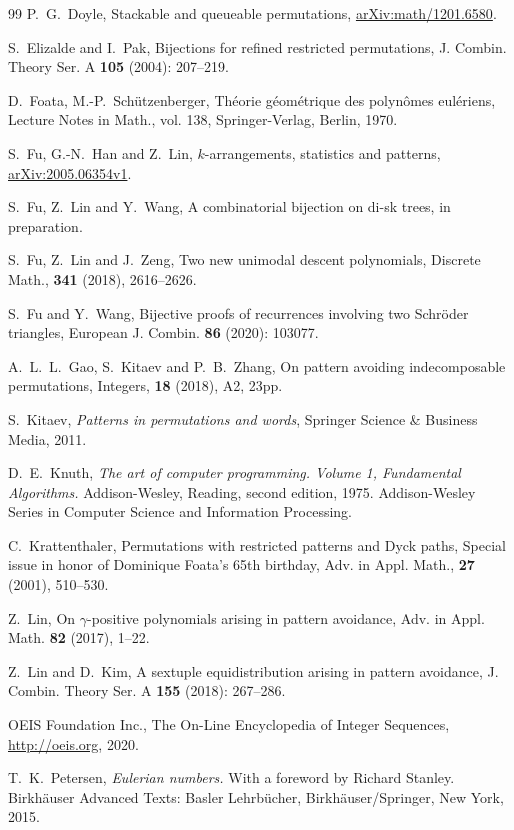 \documentclass[12pt]{amsart}
\numberwithin{equation}{section}
\theoremstyle{plain}
\theoremstyle{definition}
\begin{document}
\begin{thebibliography}{99}
 P.~G.~Doyle, Stackable and queueable permutations, \href{https://arxiv.org/abs/1201.6580}{arXiv:math/1201.6580}. 

 S.~Elizalde and I.~Pak, Bijections for refined restricted permutations, J. Combin. Theory Ser. A {\bf105} (2004): 207--219.

 D.~Foata, M.-P.~Sch\"utzenberger, Th\'eorie g\'eom\'etrique des polyn\^omes eul\'eriens, Lecture Notes in
Math., vol. 138, Springer-Verlag, Berlin, 1970.

 S.~Fu, G.-N.~Han and Z.~Lin, $k$-arrangements, statistics and patterns, \href{https://arxiv.org/abs/2005.06354}{arXiv:2005.06354v1}.

 S.~Fu, Z.~Lin and Y.~Wang, A combinatorial bijection on di-sk trees, in preparation.

 S.~Fu, Z.~Lin and J.~Zeng, Two new unimodal descent polynomials, Discrete Math., {\bf341} (2018),  2616--2626.

 S.~Fu and Y.~Wang, Bijective proofs of recurrences involving two Schr\"oder triangles, European J. Combin. {\bf86} (2020): 103077.

 A.~L.~L.~Gao, S.~Kitaev and P.~B.~Zhang, On pattern avoiding indecomposable permutations, Integers, {\bf18} (2018), A2, 23pp.

 S.~Kitaev, {\em Patterns in permutations and words}, Springer Science \& Business Media, 2011. 

 D.~E.~Knuth, {\em The art of computer programming. Volume 1, Fundamental Algorithms.} Addison-Wesley, Reading, second edition, 1975. Addison-Wesley Series in Computer Science and Information Processing.

 C.~Krattenthaler, Permutations with restricted patterns and Dyck paths, 
Special issue in honor of Dominique Foata's 65th birthday, 
Adv. in Appl. Math., {\bf27} (2001), 510--530.

 Z.~Lin, On $\gamma$-positive polynomials arising in pattern avoidance, Adv. in Appl. Math. {\bf82} (2017), 1--22.

 Z.~Lin and D.~Kim, A sextuple equidistribution arising in pattern avoidance, J. Combin. Theory Ser. A {\bf 155} (2018): 267--286.

 OEIS Foundation Inc., The On-Line Encyclopedia of Integer Sequences,  \href{http://oeis.org}{http://oeis.org}, 2020.

 T.~K.~Petersen, {\em Eulerian numbers.} With a foreword by Richard Stanley. Birkh\"auser Advanced Texts: Basler Lehrb\"ucher, Birkh\"auser/Springer, New York, 2015.


\end{thebibliography}
\end{document}
